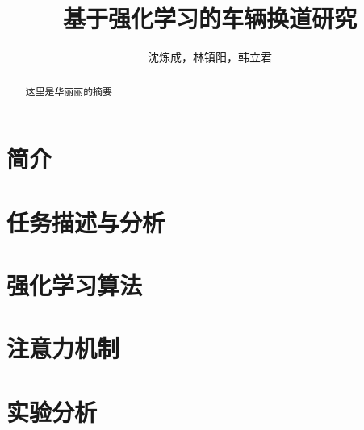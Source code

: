 \documentclass[letterpaper, 10 pt, conference]{ieeeconf}  %
\title{\LARGE \bf
基于强化学习的车辆换道研究
}
\author{沈炼成，林镇阳，韩立君 }%
\begin{document}
\maketitle
\thispagestyle{empty}
\pagestyle{empty}


\begin{abstract}
这里是华丽丽的摘要


\end{abstract}


\section{简介}

\section{任务描述与分析}



\section{强化学习算法}

\section{注意力机制}

\section{实验分析}



\addtolength{\textheight}{-1cm}   %




\end{document}
